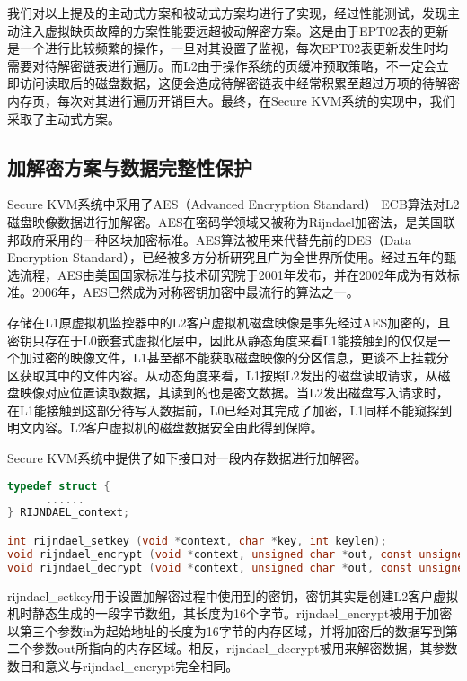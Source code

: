 我们对以上提及的主动式方案和被动式方案均进行了实现，经过性能测试，发现主动注入虚拟缺页故障的方案性能要远超被动解密方案。这是由于EPT02表的更新是一个进行比较频繁的操作，一旦对其设置了监视，每次EPT02表更新发生时均需要对待解密链表进行遍历。而L2由于操作系统的页缓冲预取策略，不一定会立即访问读取后的磁盘数据，这便会造成待解密链表中经常积累至超过万项的待解密内存页，每次对其进行遍历开销巨大。最终，在Secure KVM系统的实现中，我们采取了主动式方案。

\subsection{加解密方案与数据完整性保护}

Secure KVM系统中采用了AES（Advanced Encryption Standard） ECB算法对L2磁盘映像数据进行加解密\cite{daemen2002design}。AES在密码学领域又被称为Rijndael加密法，是美国联邦政府采用的一种区块加密标准。AES算法被用来代替先前的DES（Data Encryption Standard）\cite{biham1993differential}，已经被多方分析研究且广为全世界所使用。经过五年的甄选流程，AES由美国国家标准与技术研究院于2001年发布，并在2002年成为有效标准。2006年，AES已然成为对称密钥加密中最流行的算法之一。

存储在L1原虚拟机监控器中的L2客户虚拟机磁盘映像是事先经过AES加密的，且密钥只存在于L0嵌套式虚拟化层中，因此从静态角度来看L1能接触到的仅仅是一个加过密的映像文件，L1甚至都不能获取磁盘映像的分区信息，更谈不上挂载分区获取其中的文件内容。从动态角度来看，L1按照L2发出的磁盘读取请求，从磁盘映像对应位置读取数据，其读到的也是密文数据。当L2发出磁盘写入请求时，在L1能接触到这部分待写入数据前，L0已经对其完成了加密，L1同样不能窥探到明文内容。L2客户虚拟机的磁盘数据安全由此得到保障。

Secure KVM系统中提供了如下接口对一段内存数据进行加解密。

\begin{lstlisting}[language={C}, caption={inject\_virtual\_ept\_fault函数实现源码}]
typedef struct {
	  ......
} RIJNDAEL_context;

int rijndael_setkey (void *context, char *key, int keylen);
void rijndael_encrypt (void *context, unsigned char *out, const unsigned char *in);
void rijndael_decrypt (void *context, unsigned char *out, const unsigned char *in);
\end{lstlisting}

rijndael\_setkey用于设置加解密过程中使用到的密钥，密钥其实是创建L2客户虚拟机时静态生成的一段字节数组，其长度为16个字节。rijndael\_encrypt被用于加密以第三个参数in为起始地址的长度为16字节的内存区域，并将加密后的数据写到第二个参数out所指向的内存区域。相反，rijndael\_decrypt被用来解密数据，其参数数目和意义与rijndael\_encrypt完全相同。

